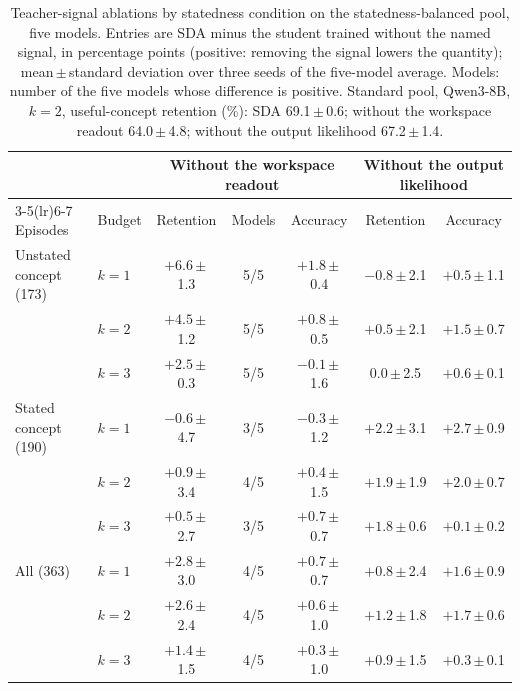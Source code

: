 \begin{table}[t]
\centering
\caption{Teacher-signal ablations by statedness condition on the statedness-balanced pool, five models. Entries are SDA minus the student trained without the named signal, in percentage points (positive: removing the signal lowers the quantity); mean\,$\pm$\,standard deviation over three seeds of the five-model average. Models: number of the five models whose difference is positive. Standard pool, Qwen3-8B, $k=2$, useful-concept retention (\%): SDA 69.1\,$\pm$\,0.6; without the workspace readout 64.0\,$\pm$\,4.8; without the output likelihood 67.2\,$\pm$\,1.4.}
\label{tab:teacherretention}
\small
\setlength{\tabcolsep}{4pt}
\begin{tabular}{llccccc}
\toprule
 & & \multicolumn{3}{c}{Without the workspace readout} & \multicolumn{2}{c}{Without the output likelihood} \\
\cmidrule(lr){3-5}\cmidrule(lr){6-7}
Episodes & Budget & Retention & Models & Accuracy & Retention & Accuracy \\
\midrule
Unstated concept (173) & $k=1$ & $+6.6$\,$\pm$\,1.3 & 5/5 & $+1.8$\,$\pm$\,0.4 & $-0.8$\,$\pm$\,2.1 & $+0.5$\,$\pm$\,1.1 \\
 & $k=2$ & $+4.5$\,$\pm$\,1.2 & 5/5 & $+0.8$\,$\pm$\,0.5 & $+0.5$\,$\pm$\,2.1 & $+1.5$\,$\pm$\,0.7 \\
 & $k=3$ & $+2.5$\,$\pm$\,0.3 & 5/5 & $-0.1$\,$\pm$\,1.6 & $0.0$\,$\pm$\,2.5 & $+0.6$\,$\pm$\,0.1 \\
\addlinespace
Stated concept (190) & $k=1$ & $-0.6$\,$\pm$\,4.7 & 3/5 & $-0.3$\,$\pm$\,1.2 & $+2.2$\,$\pm$\,3.1 & $+2.7$\,$\pm$\,0.9 \\
 & $k=2$ & $+0.9$\,$\pm$\,3.4 & 4/5 & $+0.4$\,$\pm$\,1.5 & $+1.9$\,$\pm$\,1.9 & $+2.0$\,$\pm$\,0.7 \\
 & $k=3$ & $+0.5$\,$\pm$\,2.7 & 3/5 & $+0.7$\,$\pm$\,0.7 & $+1.8$\,$\pm$\,0.6 & $+0.1$\,$\pm$\,0.2 \\
\addlinespace
All (363) & $k=1$ & $+2.8$\,$\pm$\,3.0 & 4/5 & $+0.7$\,$\pm$\,0.7 & $+0.8$\,$\pm$\,2.4 & $+1.6$\,$\pm$\,0.9 \\
 & $k=2$ & $+2.6$\,$\pm$\,2.4 & 4/5 & $+0.6$\,$\pm$\,1.0 & $+1.2$\,$\pm$\,1.8 & $+1.7$\,$\pm$\,0.6 \\
 & $k=3$ & $+1.4$\,$\pm$\,1.5 & 4/5 & $+0.3$\,$\pm$\,1.0 & $+0.9$\,$\pm$\,1.5 & $+0.3$\,$\pm$\,0.1 \\
\bottomrule
\end{tabular}
\end{table}
